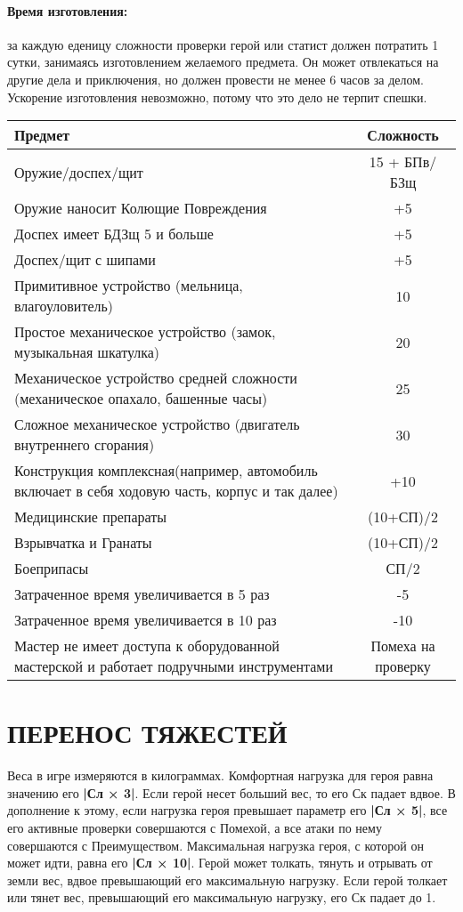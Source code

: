 \paragraph{Время изготовления:} за каждую еденицу сложности проверки герой или статист должен потратить 1 сутки, занимаясь изготовлением желаемого предмета. Он может отвлекаться на другие дела и приключения, но должен провести не менее 6 часов за делом. Ускорение изготовления невозможно, потому что это дело не терпит спешки.
\begin{center}
\begin{tabular}{|p{10cm}|c|}
\hline
Предмет & Сложность \\ \hline
Оружие/доспех/щит & 15 + БПв/БЗщ \\ \hline
Оружие наносит Колющие Повреждения & +5 \\ \hline
Доспех имеет БДЗщ 5 и больше & +5 \\ \hline
Доспех/щит с шипами & +5 \\ \hline
Примитивное устройство (мельница, влагоуловитель) & 10 \\ \hline
Простое механическое устройство (замок, музыкальная шкатулка) & 20 \\ \hline
Механическое устройство средней сложности (механическое опахало, башенные часы) & 25 \\ \hline
Сложное механическое устройство (двигатель внутреннего сгорания) & 30 \\ \hline
Конструкция комплексная(например, автомобиль включает в себя ходовую часть, корпус и так далее) & +10 \\ \hline
Медицинские препараты & (10+СП)/2 \\ \hline
Взрывчатка и Гранаты & (10+СП)/2 \\ \hline
Боеприпасы & СП/2 \\ \hline
Затраченное время увеличивается в 5 раз & -5 \\ \hline
Затраченное время увеличивается в 10 раз & -10 \\ \hline
Мастер не имеет доступа к оборудованной мастерской и работает подручными инструментами & Помеха на проверку \\ \hline
\end{tabular}
\end{center}




\section{ПЕРЕНОС ТЯЖЕСТЕЙ}
Веса в игре измеряются в килограммах. Комфортная нагрузка для героя равна значению его \textbf{|Сл × 3|}. Если герой несет больший вес, то его Ск падает вдвое. В дополнение к этому, если нагрузка героя превышает параметр его \textbf{|Сл × 5|}, все его активные проверки совершаются с Помехой, а все атаки по нему совершаются с Преимуществом. Максимальная нагрузка героя, с которой он может идти, равна его \textbf{|Сл × 10|}.
\newline
Герой может толкать, тянуть и отрывать от земли вес, вдвое превышающий его максимальную нагрузку. Если герой толкает или тянет вес, превышающий его максимальную нагрузку, его Ск падает до 1.
